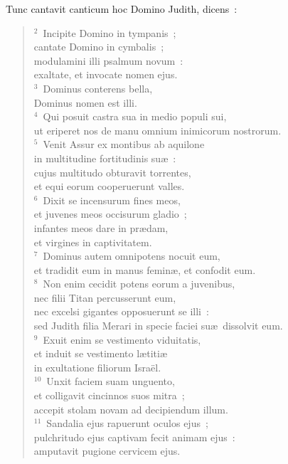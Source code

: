 \lettrine[lines=3,image=true,loversize=0.05,lraise=-0.03]{T}{}unc cantavit canticum hoc Domino Judith, dicens~:
\begin{flushleft}\begin{verse}\vspace{6pt}${}^{2}$~Incipite Domino in tympanis~;\\ cantate Domino in cymbalis~;\\ modulamini illi psalmum novum~:\\ exaltate, et invocate nomen ejus.\\
${}^{3}$~Dominus conterens bella,\\ Dominus nomen est illi.\\
${}^{4}$~Qui posuit castra sua in medio populi sui,\\ ut eriperet nos de manu omnium inimicorum nostrorum.\\
${}^{5}$~Venit Assur ex montibus ab aquilone\\ in multitudine fortitudinis su\ae~:\\ cujus multitudo obturavit torrentes,\\ et equi eorum cooperuerunt valles.\\
${}^{6}$~Dixit se incensurum fines meos,\\ et juvenes meos occisurum gladio~;\\ infantes meos dare in pr\ae dam,\\ et virgines in captivitatem.\\
${}^{7}$~Dominus autem omnipotens nocuit eum,\\ et tradidit eum in manus femin\ae , et confodit eum.\\
${}^{8}$~Non enim cecidit potens eorum a juvenibus,\\ nec filii Titan percusserunt eum,\\ nec excelsi gigantes opposuerunt se illi~:\\ sed Judith filia Merari in specie faciei su\ae\ dissolvit eum.\\
${}^{9}$~Exuit enim se vestimento viduitatis,\\ et induit se vestimento l\ae titi\ae \\ in exultatione filiorum Isra\"el.\\
${}^{10}$~Unxit faciem suam unguento,\\ et colligavit cincinnos suos mitra~;\\ accepit stolam novam ad decipiendum illum.\\
${}^{11}$~Sandalia ejus rapuerunt oculos ejus~;\\ pulchritudo ejus captivam fecit animam ejus~:\\ amputavit pugione cervicem ejus.\\

\end{verse}
\end{flushleft}
